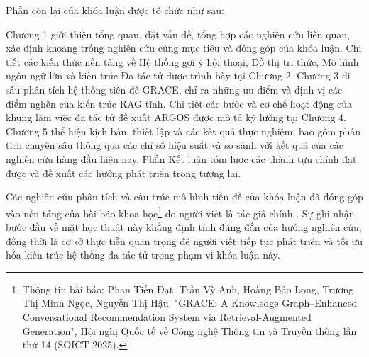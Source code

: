 Phần còn lại của khóa luận được tổ chức như sau:

Chương 1 giới thiệu tổng quan, đặt vấn đề, tổng hợp các nghiên cứu liên quan, xác định khoảng trống nghiên cứu cùng mục tiêu và đóng góp của khóa luận. Chi tiết các kiến thức nền tảng về Hệ thống gợi ý hội thoại, Đồ thị tri thức, Mô hình ngôn ngữ lớn và kiến trúc Đa tác tử được trình bày tại Chương 2. Chương 3 đi sâu phân tích hệ thống tiền đề GRACE, chỉ ra những ưu điểm và định vị các điểm nghẽn của kiến trúc RAG tĩnh. Chi tiết các bước và cơ chế hoạt động của khung làm việc đa tác tử đề xuất ARGOS được mô tả kỹ lưỡng tại Chương 4. Chương 5 thể hiện kịch bản, thiết lập và các kết quả thực nghiệm, bao gồm phân tích chuyên sâu thông qua các chỉ số hiệu suất và so sánh với kết quả của các nghiên cứu hàng đầu hiện nay. Phần Kết luận tóm lược các thành tựu chính đạt được và đề xuất các hướng phát triển trong tương lai.

Các nghiên cứu phân tích và cấu trúc mô hình tiền đề của khóa luận đã đóng góp vào nền tảng của bài báo khoa học\footnote{Thông tin bài báo: Phan Tiến Đạt, Trần Vỹ Anh, Hoàng Bảo Long, Trương Thị Minh Ngọc, Nguyễn Thị Hậu. "GRACE: A Knowledge Graph--Enhanced Conversational Recommendation System via Retrieval-Augmented Generation", Hội nghị Quốc tế về Công nghệ Thông tin và Truyền thông lần thứ 14 (SOICT 2025).} do người viết là tác giả chính \cite{phan2025grace}. Sự ghi nhận bước đầu về mặt học thuật này khẳng định tính đúng đắn của hướng nghiên cứu, đồng thời là cơ sở thực tiễn quan trọng để người viết tiếp tục phát triển và tối ưu hóa kiến trúc hệ thống đa tác tử trong phạm vi khóa luận này.




